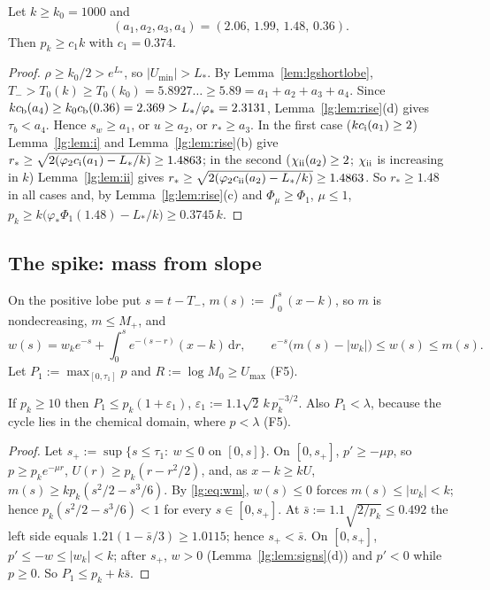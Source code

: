 \begin{lemma}\label{lg:lem:stage1}
Let $k\ge k_0=1000$ and
\[
(a_1,a_2,a_3,a_4)=(2.06,\,1.99,\,1.48,\,0.36).
\]
Then $p_k\ge c_1k$ with
$c_1=0.374$.
\end{lemma}
\begin{proof}
$\rho\ge k_0/2>e^{L_\ast}$, so $|U_{\min}|>L_\ast$. By Lemma~\ref{lem:lgshortlobe},
$T_->T_0(k)\ge T_0(k_0)=5.8927\ldots\ge5.89=a_1+a_2+a_3+a_4$. Since $kc_{\rm b}(a_4)\ge
k_0c_{\rm b}(0.36)=2.369>L_\ast/\varphi_\ast=2.3131$, Lemma~\ref{lg:lem:rise}(d) gives $\tau_b<a_4$.
Hence $s_w\ge a_1$, or $u\ge a_2$, or $r_\ast\ge a_3$. In the first case
($kc_{\rm i}(a_1)\ge2$) Lemma~\ref{lg:lem:i} and Lemma~\ref{lg:lem:rise}(b) give
$r_\ast\ge\sqrt{2(\varphi_2c_{\rm i}(a_1)-L_\ast/k)}\ge1.4863$; in the second
($\chi_{\rm ii}(a_2)\ge2$; $\chi_{\rm ii}$ is increasing in $k$) Lemma~\ref{lg:lem:ii} gives
$r_\ast\ge\sqrt{2(\varphi_2c_{\rm ii}(a_2)-L_\ast/k)}\ge1.4863$. So $r_\ast\ge1.48$ in all cases and,
by Lemma~\ref{lg:lem:rise}(c) and $\Phi_\mu\ge\Phi_1$, $\mu\le1$,
$p_k\ge k\bigl(\varphi_\ast\Phi_1(1.48)-L_\ast/k\bigr)\ge0.3745\,k$.
\end{proof}

\subsection{The spike: mass from slope}\label{lg:sec:spike}
On the positive lobe put $s=t-T_-$, $m(s):=\int_0^s(x-k)$, so $m$ is nondecreasing, $m\le M_+$, and
\begin{equation}\label{lg:eq:wm}
w(s)=w_ke^{-s}+\int_0^se^{-(s-r)}(x-k)\,\mathrm dr,\qquad e^{-s}\bigl(m(s)-|w_k|\bigr)\le w(s)\le m(s).
\end{equation}
Let $P_1:=\max_{[0,\tau_1]}p$ and $R:=\log M_0\ge U_{\max}$ (F5).

\begin{lemma}\label{lg:lem:P1}
If $p_k\ge10$ then $P_1\le p_k(1+\varepsilon_1)$, $\varepsilon_1:=1.1\sqrt2\,k\,p_k^{-3/2}$. Also
$P_1<\lambda$, because the cycle lies in the chemical domain, where $p<\lambda$ \textup{(F5)}.
\end{lemma}
\begin{proof}
Let $s_+:=\sup\{s\le\tau_1:\ w\le0\text{ on }[0,s]\}$. On $[0,s_+]$, $p'\ge-\mu p$, so
$p\ge p_ke^{-\mu r}$, $U(r)\ge p_k(r-r^2/2)$, and, as $x-k\ge kU$, $m(s)\ge kp_k(s^2/2-s^3/6)$.
By \eqref{lg:eq:wm}, $w(s)\le0$ forces $m(s)\le|w_k|<k$; hence $p_k(s^2/2-s^3/6)<1$ for every
$s\in[0,s_+]$. At $\bar s:=1.1\sqrt{2/p_k}\le0.492$ the left side equals
$1.21(1-\bar s/3)\ge1.0115$; hence $s_+<\bar s$. On $[0,s_+]$, $p'\le-w\le|w_k|<k$; after
$s_+$, $w>0$ (Lemma~\ref{lg:lem:signs}(d)) and $p'<0$ while $p\ge0$. So $P_1\le p_k+k\bar s$.
\end{proof}

